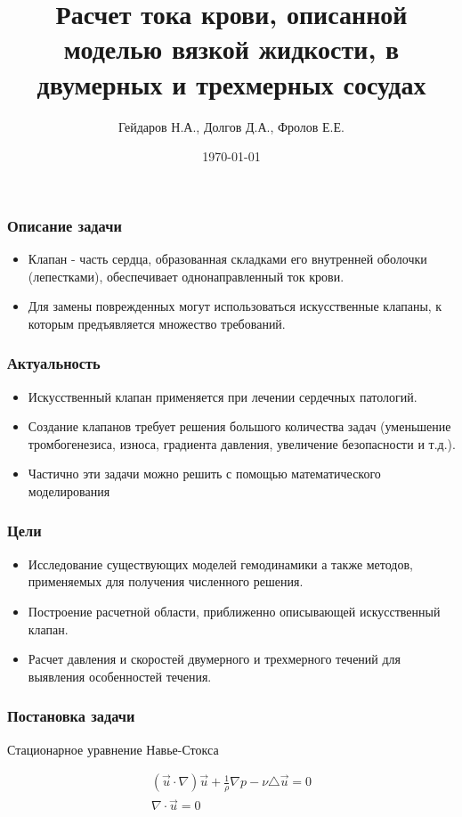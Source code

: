 \documentclass[14pt]{beamer}
\title{Расчет тока крови, описанной моделью вязкой жидкости, в двумерных и трехмерных сосудах}
\date{\today}
\author{Гейдаров Н.А., Долгов Д.А., Фролов Е.Е.}
\institute{Кемеровский Государственный Университет \\
    \vspace{0.7cm}
    \vspace{0.7cm}
}
\begin{document}
\maketitle

\begin{frame}
\frametitle{Описание задачи}
\begin{center}
\begin{itemize}
	\item Клапан - часть сердца, образованная складками его внутренней оболочки (лепестками), обеспечивает однонаправленный ток крови.
	\item Для замены поврежденных могут использоваться искусственные клапаны, к которым предъявляется множество требований.
\end{itemize}
\end{center}

\end{frame}

\begin{frame}
\frametitle{Актуальность}
\begin{itemize}
	\item Искусственный клапан применяется при лечении сердечных патологий.
	\item Создание клапанов требует решения большого количества задач (уменьшение тромбогенезиса, износа, градиента давления, увеличение безопасности и т.д.).
    \item Частично эти задачи можно решить с помощью математического моделирования
\end{itemize}
\end{frame}

\begin{frame}
\frametitle{Цели}
\begin{itemize}
	\item Исследование существующих моделей гемодинамики а также методов, применяемых для получения численного решения.
	\item Построение расчетной области, приближенно описывающей искусственный клапан.
	\item Расчет давления и скоростей двумерного и трехмерного течений для выявления особенностей течения.
\end{itemize}
\end{frame}

\begin{frame}
\frametitle{Постановка задачи}
Стационарное уравнение Навье-Стокса

\begin{gather}
\label{eq:SteadyNavierStokesMotion}
(\vec u \cdot \nabla)\vec u + \frac{1}{\rho}\nabla p - \nu \triangle \vec u = 0\\
\label{eq:ContinuityEquation}
\nabla \cdot \vec u = 0
\end{gather}
\end{frame}
\end{document}
